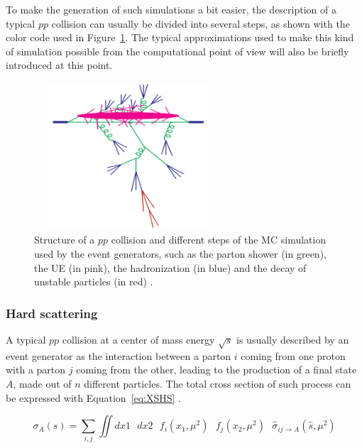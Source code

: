 \documentclass[a4paper, 10pt, openright]{report}
\begin{document}
To make the generation of such simulations a bit easier, the description of a typical $pp$ collision can usually be divided into several steps, as shown with the color code used in Figure~\ref{fig:MCGen}. The typical approximations used to make this kind of simulation possible from the computational point of view will also be briefly introduced at this point.

\begin{figure}[htbp]
\begin{center}
\includegraphics[width=7cm, height=5.5cm]{figs/MCGen.png}
\caption{Structure of a $pp$ collision and different steps of the \ac{MC} simulation used by the event generators, such as the parton shower (in green), the \ac{UE} (in pink), the hadronization (in blue) and the decay of unstable particles (in red) \cite{MCGen}.}
\label{fig:MCGen}
\end{center}
\end{figure}

\subsubsection*{Hard scattering}

A typical $pp$ collision at a center of mass energy $\sqrt{s}$ is usually described by an event generator as the interaction between a parton $i$ coming from one proton with a parton $j$ coming from the other, leading to the production of a final state $A$, made out of $n$ different particles. The total cross section of such process can be expressed with Equation~\ref{eq:XSHS} \cite{MCGen2}.

\begin{equation}
\label{eq:XSHS}
\sigma_A(s) = \sum_{i, j} \iint dx1 \text{ } dx2 \text{ } f_i(x_1, \mu^2) \text{ } f_j(x_2, \mu^2) \text{ } \hat{\sigma}_{ij \rightarrow A}(\hat{s}, \mu^2)
\end{equation}
\end{document}
